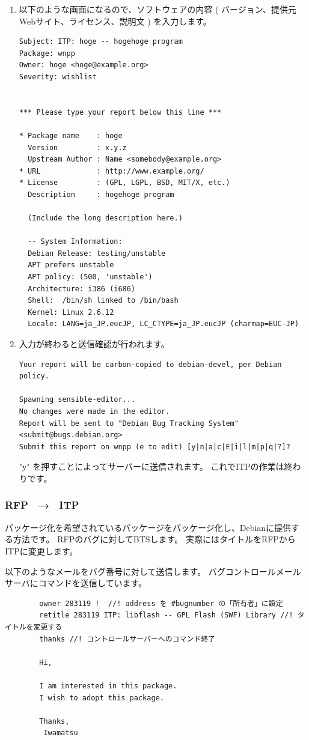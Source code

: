 \documentclass[mingoth]{jsarticle}
\begin{document}
\begin{enumerate}
        \item 以下のような画面になるので、ソフトウェアの内容 ( バージョン、提供元Webサイト、ライセンス、説明文 ) を入力します。
		\begin{verbatim}
Subject: ITP: hoge -- hogehoge program
Package: wnpp
Owner: hoge <hoge@example.org>
Severity: wishlist


*** Please type your report below this line ***

* Package name    : hoge
  Version         : x.y.z
  Upstream Author : Name <somebody@example.org>
* URL             : http://www.example.org/
* License         : (GPL, LGPL, BSD, MIT/X, etc.)
  Description     : hogehoge program

  (Include the long description here.)

  -- System Information:
  Debian Release: testing/unstable
  APT prefers unstable
  APT policy: (500, 'unstable')
  Architecture: i386 (i686)
  Shell:  /bin/sh linked to /bin/bash
  Kernel: Linux 2.6.12
  Locale: LANG=ja_JP.eucJP, LC_CTYPE=ja_JP.eucJP (charmap=EUC-JP)
		\end{verbatim}

        \item 入力が終わると送信確認が行われます。
		\begin{verbatim}
Your report will be carbon-copied to debian-devel, per Debian policy.

Spawning sensible-editor...
No changes were made in the editor.
Report will be sent to "Debian Bug Tracking System" <submit@bugs.debian.org>
Submit this report on wnpp (e to edit) [y|n|a|c|E|i|l|m|p|q|?]?

			\end{verbatim}
            "y" を押すことによってサーバーに送信されます。
            これでITPの作業は終わりです。
		\end{enumerate}
    \subsubsection{ RFP　→　ITP }
        パッケージ化を希望されているパッケージをパッケージ化し、Debianに提供する方法です。
        RFPのバグに対してBTSします。
        実際にはタイトルをRFPからITPに変更します。

		以下のようなメールをバグ番号に対して送信します。
		バグコントロールメールサーバにコマンドを送信しています。
		
		\begin{verbatim}
        owner 283119 !	//! address を #bugnumber の「所有者」に設定
        retitle 283119 ITP: libflash -- GPL Flash (SWF) Library //! タイトルを変更する
        thanks //! コントロールサーバーへのコマンド終了

        Hi,

        I am interested in this package.
        I wish to adopt this package.

        Thanks,
         Iwamatsu
		\end{verbatim}
\end{document}
